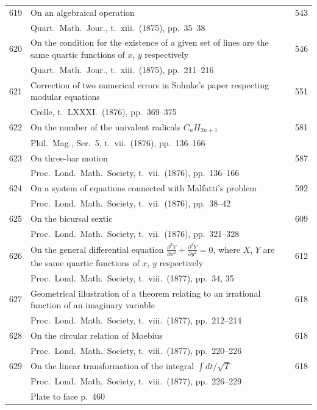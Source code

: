 \documentclass[12pt,a4paper]{article}
\theoremstyle{plain}
\theoremstyle{definition}
\begin{document}
\begin{longtable}{r @{. } p{4.8in} r}
619 & On an algebraical operation & 543 \\
  & Quart.\ Math.\ Jour., t.\ xiii.\ (1875), pp.\ 35--38 & \\ 

620 & On the condition for the existence of a given set of lines are the same quartic functions of $x$, $y$ respectively & 546 \\
  & Quart.\ Math.\ Jour., t.\ xiii.\ (1875), pp.\ 211--216 & \\ 

621 & Correction of two numerical errors in Sohnke's paper respecting modular equations & 551 \\
  & Crelle, t.\ LXXXI.\ (1876), pp.\ 369--375 & \\ 

622 & On the number of the univalent radicals $C_n H_{2n+1}$ & 581 \\
  & Phil.\ Mag., Ser.\ 5, t.\ vii.\ (1876), pp.\ 136--166 & \\ 

623 & On three-bar motion & 587 \\
  & Proc.\ Lond.\ Math.\ Society, t.\ vii.\ (1876), pp.\ 136--166 & \\ 

624 & On a system of equations connected with Malfatti's problem & 592 \\
  & Proc.\ Lond.\ Math.\ Society, t.\ vii.\ (1876), pp.\ 38--42 & \\ 

625 & On the bicursal sextic & 609 \\
  & Proc.\ Lond.\ Math.\ Society, t.\ vii.\ (1876), pp.\ 321--328 & \\ 

626 & On the general differential equation $\frac{\partial^2 Y}{\partial x^2} + \frac{\partial^2 Y}{\partial y^2} = 0$, where $X$, $Y$ are the same quartic functions of $x$, $y$ respectively & 612 \\
  & Proc.\ Lond.\ Math.\ Society, t.\ viii.\ (1877), pp.\ 34, 35 & \\ 

627 & Geometrical illustration of a theorem relating to an irrational function of an imaginary variable & 618 \\
  & Proc.\ Lond.\ Math.\ Society, t.\ viii.\ (1877), pp.\ 212--214 & \\ 

628 & On the circular relation of Moebius & 618 \\
  & Proc.\ Lond.\ Math.\ Society, t.\ viii.\ (1877), pp.\ 220--226 & \\ 

629 & On the linear transformation of the integral $\int dt / \sqrt{T}$ & 618 \\
  & Proc.\ Lond.\ Math.\ Society, t.\ viii.\ (1877), pp.\ 226--229 & \\ 
  & Plate to face p.\ 460 & \\ 
\end{longtable}
\end{document}
